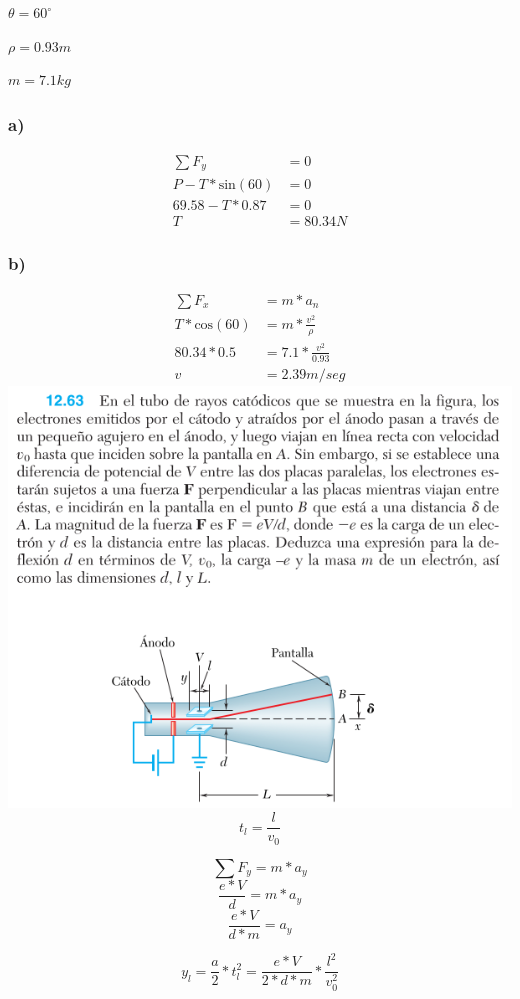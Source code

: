 \documentclass[12pt,fleqn]{article}
\begin{document}
$\theta=60^\circ$

$\rho=0.93m$

$m=7.1kg$
\subsubsection*{a)}
\begin{align*}
  \sum{F_y}&=0\tag{el martillo no tiene aceleración vertical}\\
  P-T*\textrm{sin}(60)&=0\\
  69.58-T*0.87&=0\\
  T&=80.34N
\end{align*}
\subsubsection*{b)}
\begin{align*}
  \sum{F_x}&=m*a_n\tag{sumatoria de fuerzas en el eje x}\\
  T*\textrm{cos}(60)&=m*\frac{v^2}{\rho}\\
  80.34*0.5&=7.1*\frac{v^2}{0.93}\\
  v&=2.39m/seg
\end{align*}
\newpage
\includegraphics[width=\linewidth]{12.63}
\newpage
\[t_l=\frac{l}{v_0}\tag{tiempo que le toma al electrón recorrer las placas}\]

\[\sum{F_y}=m*a_y\tag{sumatoria de fuerzas en el eje y}\]
\[\frac{e*V}{d}=m*a_y\]
\[\frac{e*V}{d*m}=a_y\]

\[y_l=\frac{a}{2}*t_l^2=\frac{e*V}{2*d*m}*\frac{l^2}{v_0^2}\tag{distancia en y cuando sale de las placas}\]
\end{document}
